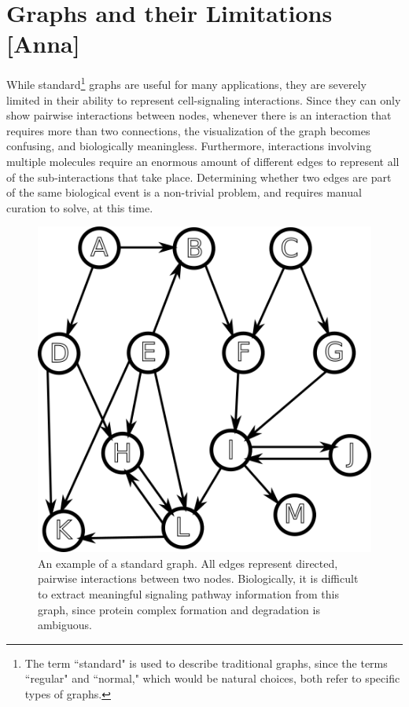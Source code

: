 \documentclass[12pt,twoside]{reedthesis}
\newcommand{\new}[2]{{\color{orange}#1 [#2]}}
\theoremstyle{definition}
\begin{document}
\section{\new{Graphs and their Limitations}{Anna}}

While standard\footnote{The term ``standard" is used to describe traditional graphs, since the terms ``regular" and ``normal," which would be natural choices, both refer to specific types of graphs.} graphs are useful for many applications, they are severely limited in their ability to represent cell-signaling interactions.  Since they can only show pairwise interactions between nodes, whenever there is an interaction that requires more than two connections, the visualization of the graph becomes confusing, and biologically meaningless.  Furthermore, interactions involving multiple molecules require an enormous amount of different edges to represent all of the sub-interactions that take place.  Determining whether two edges are part of the same biological event is a non-trivial problem, and requires manual curation to solve, at this time.\par

\begin{figure}[thbp]
  \begin{center}
    \includegraphics{example-standard-graph}
  \caption[A standard graph]{An example of a standard graph. All edges represent directed, pairwise interactions between two nodes. Biologically, it is difficult to extract meaningful signaling pathway information from this graph, since protein complex formation and degradation is ambiguous.}
  \label{fig:example-standard-graph}
  \end{center}
\end{figure}
\end{document}
